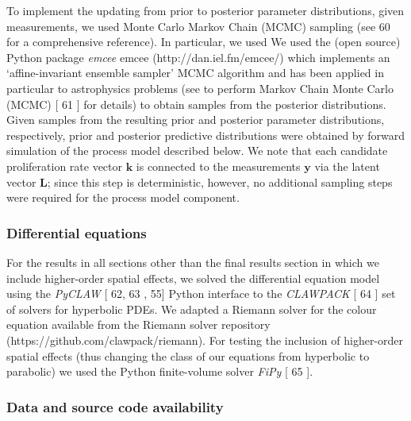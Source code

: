 \documentclass[10pt,letterpaper]{article}
\providecommand{\DIFaddtex}[1]{{\protect\color{blue} \sf #1}} %
\providecommand{\DIFdeltex}[1]{{\protect\color{red} \scriptsize #1}} %
\providecommand{\DIFaddbegin}{} %
\providecommand{\DIFaddend}{} %
\providecommand{\DIFdelbegin}{} %
\providecommand{\DIFdelend}{} %
\providecommand{\DIFadd}[1]{\texorpdfstring{\DIFaddtex{#1}}{#1}} %
\providecommand{\DIFdel}[1]{\texorpdfstring{\DIFdeltex{#1}}{}} %
\begin{document}
\DIFdelbegin \DIFdel{To implement the updating from prior to posterior parameter
distributions, given measurements, we used Monte Carlo Markov Chain
(MCMC) sampling (see }%
\DIFdel{60}%
\DIFdel{for a comprehensive reference). In
particular, we used }\DIFdelend \DIFaddbegin \DIFadd{We used }\DIFaddend the (open source) Python package \DIFdelbegin \DIFdel{\emph{emcee}
}\DIFdelend \DIFaddbegin \DIFadd{emcee
}\DIFaddend (http://dan.iel.fm/emcee/) \DIFdelbegin \DIFdel{which implements an `affine-invariant
ensemble sampler' MCMC algorithm and has been applied in particular to astrophysics problems (see }\DIFdelend \DIFaddbegin \DIFadd{to perform Markov Chain Monte Carlo (MCMC)
}\DIFaddend {[}\DIFdelbegin \DIFdel{61}\DIFdelend \DIFaddbegin \DIFadd{53}\DIFaddend {]} \DIFdelbegin \DIFdel{for details)}\DIFdelend \DIFaddbegin \DIFadd{to obtain samples from the posterior distributions}\DIFaddend . Given
samples from the resulting prior and posterior parameter distributions,
respectively, prior and posterior predictive distributions were obtained
by forward simulation of the process model described below. We note that
each candidate proliferation rate vector \(\mathbf{k}\) is connected to
the measurements \(\mathbf{y}\) via the latent vector \(\mathbf{L}\);
since this step is deterministic, however, no additional sampling steps
were required for the process model component.

\subsubsection{Differential equations}\label{differential-equations}

For the results in all sections other than the final results section in
which we include higher-order spatial effects, we solved the
differential equation model using the \emph{PyCLAW} {[}\DIFdelbegin \DIFdel{62, 63}\DIFdelend \DIFaddbegin \DIFadd{54, 55}\DIFaddend {]} Python
interface to the \emph{CLAWPACK} {[}\DIFdelbegin \DIFdel{64}\DIFdelend \DIFaddbegin \DIFadd{56}\DIFaddend {]} set of solvers for hyperbolic
PDEs. We adapted a Riemann solver for the colour equation available from
the Riemann solver repository (https://github.com/clawpack/riemann). For
testing the inclusion of higher-order spatial effects (thus changing the
class of our equations from hyperbolic to parabolic) we used the Python
finite-volume solver \emph{FiPy} {[}\DIFdelbegin \DIFdel{65}\DIFdelend \DIFaddbegin \DIFadd{57}\DIFaddend {]}.

\subsubsection{Data and source code
availability}\label{data-and-source-code-availability}
\end{document}
